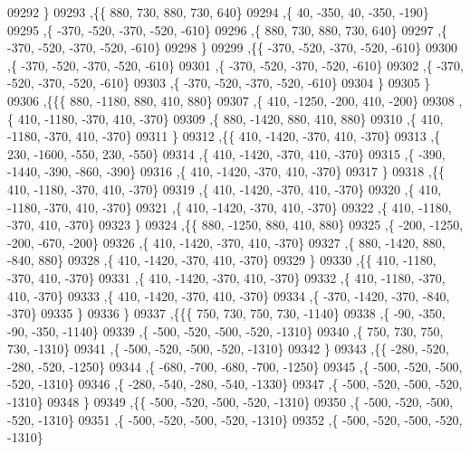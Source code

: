 \begin{DoxyCode}
09292     \}
09293    ,\{\{   880,   730,   880,   730,   640\}
09294     ,\{    40,  -350,    40,  -350,  -190\}
09295     ,\{  -370,  -520,  -370,  -520,  -610\}
09296     ,\{   880,   730,   880,   730,   640\}
09297     ,\{  -370,  -520,  -370,  -520,  -610\}
09298     \}
09299    ,\{\{  -370,  -520,  -370,  -520,  -610\}
09300     ,\{  -370,  -520,  -370,  -520,  -610\}
09301     ,\{  -370,  -520,  -370,  -520,  -610\}
09302     ,\{  -370,  -520,  -370,  -520,  -610\}
09303     ,\{  -370,  -520,  -370,  -520,  -610\}
09304     \}
09305    \}
09306   ,\{\{\{   880, -1180,   880,   410,   880\}
09307     ,\{   410, -1250,  -200,   410,  -200\}
09308     ,\{   410, -1180,  -370,   410,  -370\}
09309     ,\{   880, -1420,   880,   410,   880\}
09310     ,\{   410, -1180,  -370,   410,  -370\}
09311     \}
09312    ,\{\{   410, -1420,  -370,   410,  -370\}
09313     ,\{   230, -1600,  -550,   230,  -550\}
09314     ,\{   410, -1420,  -370,   410,  -370\}
09315     ,\{  -390, -1440,  -390,  -860,  -390\}
09316     ,\{   410, -1420,  -370,   410,  -370\}
09317     \}
09318    ,\{\{   410, -1180,  -370,   410,  -370\}
09319     ,\{   410, -1420,  -370,   410,  -370\}
09320     ,\{   410, -1180,  -370,   410,  -370\}
09321     ,\{   410, -1420,  -370,   410,  -370\}
09322     ,\{   410, -1180,  -370,   410,  -370\}
09323     \}
09324    ,\{\{   880, -1250,   880,   410,   880\}
09325     ,\{  -200, -1250,  -200,  -670,  -200\}
09326     ,\{   410, -1420,  -370,   410,  -370\}
09327     ,\{   880, -1420,   880,  -840,   880\}
09328     ,\{   410, -1420,  -370,   410,  -370\}
09329     \}
09330    ,\{\{   410, -1180,  -370,   410,  -370\}
09331     ,\{   410, -1420,  -370,   410,  -370\}
09332     ,\{   410, -1180,  -370,   410,  -370\}
09333     ,\{   410, -1420,  -370,   410,  -370\}
09334     ,\{  -370, -1420,  -370,  -840,  -370\}
09335     \}
09336    \}
09337   ,\{\{\{   750,   730,   750,   730, -1140\}
09338     ,\{   -90,  -350,   -90,  -350, -1140\}
09339     ,\{  -500,  -520,  -500,  -520, -1310\}
09340     ,\{   750,   730,   750,   730, -1310\}
09341     ,\{  -500,  -520,  -500,  -520, -1310\}
09342     \}
09343    ,\{\{  -280,  -520,  -280,  -520, -1250\}
09344     ,\{  -680,  -700,  -680,  -700, -1250\}
09345     ,\{  -500,  -520,  -500,  -520, -1310\}
09346     ,\{  -280,  -540,  -280,  -540, -1330\}
09347     ,\{  -500,  -520,  -500,  -520, -1310\}
09348     \}
09349    ,\{\{  -500,  -520,  -500,  -520, -1310\}
09350     ,\{  -500,  -520,  -500,  -520, -1310\}
09351     ,\{  -500,  -520,  -500,  -520, -1310\}
09352     ,\{  -500,  -520,  -500,  -520, -1310\}

\end{DoxyCode}
